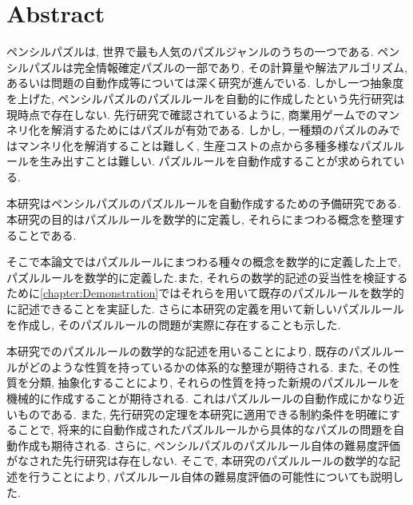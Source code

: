\chapter*{{\rm \bf Abstract}}\label{chapter:Abstract}
ペンシルパズルは, 世界で最も人気のパズルジャンルのうちの一つである. ペンシルパズルは完全情報確定パズルの一部であり, その計算量や解法アルゴリズム, あるいは問題の自動作成等については深く研究が進んでいる. しかし一つ抽象度を上げた, ペンシルパズルのパズルルールを自動的に作成したという先行研究は現時点で存在しない. 先行研究で確認されているように, 商業用ゲームでのマンネリ化を解消するためにはパズルが有効である. しかし, 一種類のパズルのみではマンネリ化を解消することは難しく, 生産コストの点から多種多様なパズルルールを生み出すことは難しい. パズルルールを自動作成することが求められている.

本研究はペンシルパズルのパズルルールを自動作成するための予備研究である. 本研究の目的はパズルルールを数学的に定義し, それらにまつわる概念を整理することである.

そこで本論文ではパズルルールにまつわる種々の概念を数学的に定義した上で, パズルルールを数学的に定義した.また, それらの数学的記述の妥当性を検証するために\cref{chapter:Demonstration}ではそれらを用いて既存のパズルルールを数学的に記述できることを実証した. さらに本研究の定義を用いて新しいパズルルールを作成し, そのパズルルールの問題が実際に存在することも示した.

本研究でのパズルルールの数学的な記述を用いることにより, 既存のパズルルールがどのような性質を持っているかの体系的な整理が期待される. また, その性質を分類, 抽象化することにより, それらの性質を持った新規のパズルルールを機械的に作成することが期待される. これはパズルルールの自動作成にかなり近いものである. また, 先行研究の定理を本研究に適用できる制約条件を明確にすることで, 将来的に自動作成されたパズルルールから具体的なパズルの問題を自動作成も期待される. さらに, ペンシルパズルのパズルルール自体の難易度評価がなされた先行研究は存在しない. そこで, 本研究のパズルルールの数学的な記述を行うことにより, パズルルール自体の難易度評価の可能性についても説明した.
